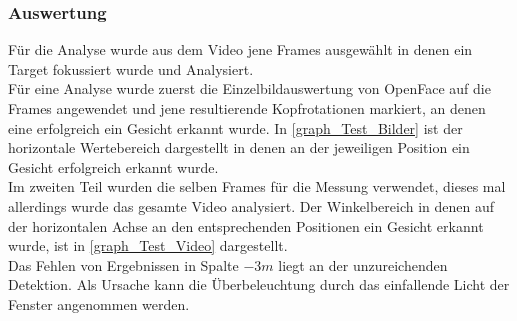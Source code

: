 \subsubsection{Auswertung}
Für die Analyse wurde aus dem Video jene Frames ausgewählt in denen ein Target fokussiert wurde und Analysiert.\\
Für eine Analyse wurde zuerst die Einzelbildauswertung von OpenFace auf die Frames angewendet und jene resultierende Kopfrotationen markiert, an denen eine erfolgreich ein Gesicht erkannt wurde. In \autoref{graph_Test_Bilder} ist der horizontale Wertebereich dargestellt in denen an der jeweiligen Position ein Gesicht erfolgreich erkannt wurde.\\
Im zweiten Teil wurden die selben Frames für die Messung verwendet, dieses mal allerdings wurde das gesamte Video analysiert. Der Winkelbereich in denen auf der horizontalen Achse an den entsprechenden Positionen ein Gesicht erkannt wurde, ist in \autoref{graph_Test_Video} dargestellt.\\
Das Fehlen von Ergebnissen in Spalte $-3m$ liegt an der unzureichenden Detektion. Als Ursache kann die Überbeleuchtung durch das einfallende Licht der Fenster angenommen werden. 
